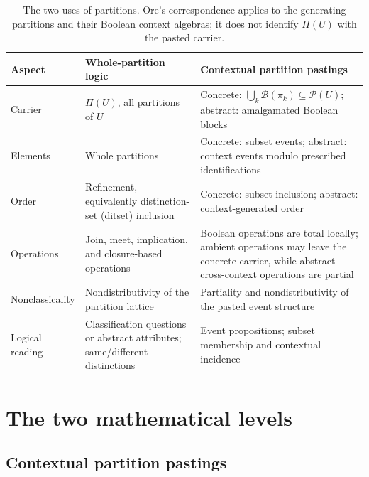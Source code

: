 \documentclass[aps,pra,reprint,nofootinbib]{revtex4-2}
\newcommand{\Pow}{\mathcal{P}}
\newcommand{\Part}{\Pi}
\newcommand{\BA}{\mathcal{B}}
\begin{document}
\begin{table}[t]
\caption{The two uses of partitions.  Ore's correspondence applies to
the generating partitions and their Boolean context algebras; it does not
identify $\Part(U)$ with the pasted carrier.}
\label{tab:two-levels}
\begin{ruledtabular}
\begin{tabular}{p{}p{}p{}}
Aspect & Whole-partition logic & Contextual partition pastings \\
\hline
Carrier & $\Part(U)$, all partitions of $U$
& Concrete: $\bigcup_k\BA(\pi_k)\subseteq\Pow(U)$; abstract: amalgamated
Boolean blocks \\
Elements & Whole partitions
& Concrete: subset events; abstract: context events modulo prescribed
identifications \\
Order & Refinement, equivalently distinction-set (ditset) inclusion
& Concrete: subset inclusion; abstract: context-generated order \\
Operations & Join, meet, implication, and closure-based operations
& Boolean operations are total locally; ambient operations may leave the
concrete carrier, while abstract cross-context operations are partial \\
Nonclassicality & Nondistributivity of the partition lattice
& Partiality and nondistributivity of the pasted event structure \\
Logical reading & Classification questions or abstract attributes;
same/different distinctions
& Event propositions; subset membership and contextual incidence
\end{tabular}
\end{ruledtabular}
\end{table}

\section{The two mathematical levels}

\subsection{Contextual partition pastings}
\end{document}
